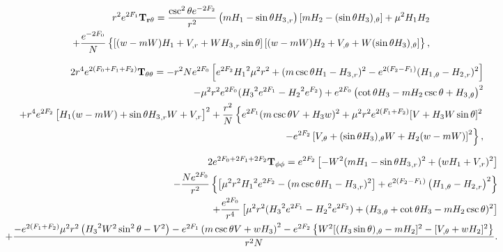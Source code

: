  



\begin{eqnarray}
&&  r^2e^{2F_1}{\bf T_{r\theta}}= \frac{ \csc ^2\theta e^{-2 {F_2}}}{r^2} \left({m} {H_1}-\sin \theta {H_3}_{,r}\right) 
 \left[{m} {H_2}-(\sin\theta 
{H_3})_{,\theta}\right] +{\mu^2}  {H_1} 
{H_2}
 \nonumber \\
%
&&
+\frac{e^{-2 {F_0}}}{N} \left\{[ (w-{m}W) {H_1}+V_{,r}+ W{H_3}_{,r}\sin\theta ] \left[(w-{m}W) {H_2}+V_{,\theta}+W
(\sin\theta{H_3})_{,\theta}\right]
\right\},
\end{eqnarray}
  
  
 






\begin{eqnarray}
&& 2r^4e^{2(F_0+F_1+F_2)}{\bf T_{\theta\theta}}=-r^2 N e^{2 {F_0}} \left[e^{2 F_2} {H_1}^2 
{\mu^2} r^2 +( m\csc\theta H_1-{H_3}_{,r})^2  -e^{2( {F_2}-F_1)}( {H_1}_{,\theta}- 
{H_2}_{,r})^2\right] \nonumber \\
%
&&
-{\mu^2} r^2e^{2 {F_0}}({H_3}^2 e^{2 {F_1}}-{H_2}^2e^{F_2})
+e^{2 {F_0}} \left(\cot \theta {H_3}-m{H_2} \csc\theta+ {H_3}_{,\theta}\right)^2
 \nonumber \\
%
&&
+ r^4 e^{2 {F_2}} \left[
 {H_1} (w-{m} W)+ \sin\theta  {H_3}_{,r} W+
V_{,r} \right]^2
%
+\frac{r^2}{N} \left\{e^{2 {F_1}}({m} \csc\theta 
 V+{H_3}w)^2 +{\mu^2} r^2e^{2 ({F_1}+F_2)}[V+ {H_3} W \sin\theta]^2 
 \right. \nonumber \\
%
&&
\left.
-e^{2 {F_2}}\left[
V_{,\theta}+ (\sin\theta  
{H_3})_{,\theta} W+ 
{H_2} (w-{m} W)\right]^2\right\},
\end{eqnarray}
  
  
  
  
  

  
  
  
  
 \begin{eqnarray}
&& 2e^{2F_0+2F_1+2F_2}{\bf T_{\phi\phi}}=e^{2F_2}\left[ -W^2(m{H_1}  
- \sin\theta  
{H_3}_{,r} )^2
+(wH_1+V_{,r})^2\right] \nonumber \\
% 
&&
-\frac{N e^{2 {F_0}}}{r^2} \left\{\left[ {\mu^2} r^2 {H_1}^2 e^{2 {F_2}}
-({m} \csc \theta  {H_1}
-{H_3}_{,r})^2\right] +e^{2(
{F_2}-F_1)}\left( {H_1}_{,\theta}- 
{H_2}_{,r}\right)^2\right\}
\nonumber \\
%
&&
+ \frac{e^{2 F_0}}{r^4} \left[{\mu^2} 
r^2( {H_3}^2 e^{2 {F_1}}- {H_2}^2 e^{2
{F_2}}) + ({H_3}_{,\theta}+ \cot
\theta  {H_3}-mH_2\csc\theta)^2\right]  \nonumber \\
%
%
&&
+\frac{- e^{2 (F_1+{F_2})} {\mu^2} r^2\left({H_3}^2  W^2 \sin ^2\theta  - V^2\right) -e^{2 {F_1}}\left(
{m} \csc\theta 
 V +w{H_3}  \right)^2  -e^{2 {F_2}}\left\{W^2[(H_3\sin\theta)_{,\theta}-mH_2]^2-[V_{,\theta}+wH_2]^2\right\}}{r^2N} .
\nonumber \\
 && 
\end{eqnarray}  
  
